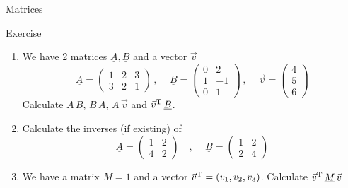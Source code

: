   \begin{frame}{Matrices}
    \begin{exampleblock}{Exercise}
      \begin{enumerate}
        \item We have 2 matrices $\underline{A}, \underline{B}$
          and a vector $\vec{v}$
          \begin{equation*}
            \underline{A} =
              \begin{pmatrix} 1 & 2 & 3 \\ 3 & 2 & 1 \end{pmatrix}
            \,\text{, }\quad
            \underline{B} =
              \begin{pmatrix} 0 & 2 \\ 1 & -1 \\ 0 & 1 \end{pmatrix}
            \,\text{, }\quad
            \vec{v} = \begin{pmatrix} 4 \\ 5 \\ 6 \end{pmatrix}
          \end{equation*}
          Calculate $\underline{A}\,\underline{B}$,
          $\underline{B}\,\underline{A}$,
          $\underline{A}\,\vec{v}$ and $\vec{v}^{\text{T}}\,\underline{B}$.
        \item Calculate the inverses (if existing) of
          \begin{equation*}
            \underline{A} =
              \begin{pmatrix} 1 & 2 \\ 4 & 2 \end{pmatrix}
            \quad\text{, }\quad
            \underline{B} =
              \begin{pmatrix} 1 & 2 \\ 2 & 4 \end{pmatrix}
          \end{equation*}
        \item We have a matrix $\underline{M} = \underline{1}$
          and a vector $\vec{v}^{\text{T}} = \left(v_1, v_2, v_3\right)$.
          Calculate $\vec{v}^{\text{T}}\, \underline{M}\, \vec{v}$
      \end{enumerate}
    \end{exampleblock}
  \end{frame}

